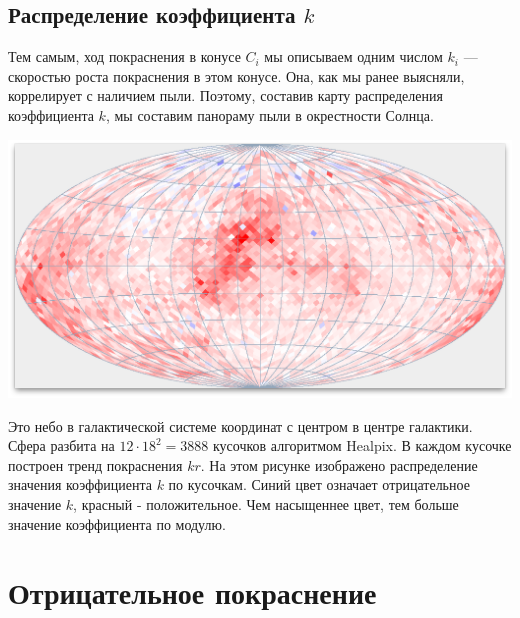 \documentclass[14pt]{article}
\begin{document}
        \subsection{Распределение коэффициента $k$}
            Тем самым, ход покраснения в конусе $C_i$ мы описываем одним числом $k_i$ --- скоростью роста покраснения в этом конусе. Она, как мы ранее выясняли, коррелирует с наличием пыли. Поэтому, составив карту распределения коэффициента $k$, мы составим панораму пыли в окрестности Солнца. 
			\begin{center}
				\includegraphics[scale=0.3]{../../presentation/map-k.png}
			\end{center}	
            Это небо в галактической системе координат с центром в центре галактики. Сфера разбита на $12 \cdot 18^2 = 3888$ кусочков алгоритмом Healpix. В каждом кусочке построен тренд покраснения $k r$. На этом рисунке изображено распределение значения коэффициента $k$ по кусочкам. Синий цвет означает отрицательное значение $k$, красный - положительное. Чем насыщеннее цвет, тем больше значение коэффициента по модулю.  
			
	\section{Отрицательное покраснение}
	
\end{document}
